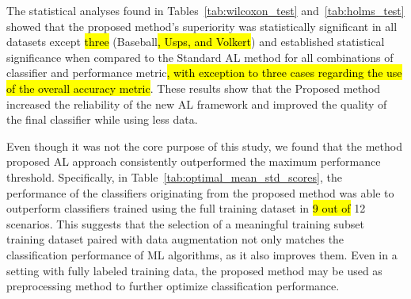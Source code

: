 \documentclass[preprint, 12pt]{elsarticle}
\begin{document}
The statistical analyses found in Tables~\ref{tab:wilcoxon_test}
and~\ref{tab:holms_test} showed that the proposed method's superiority was
statistically significant in all datasets except \hl{three} (Baseball\hl{,
Usps, and Volkert}) and established statistical significance when compared to
the Standard AL method for all combinations of classifier and performance
metric\hl{, with exception to three cases regarding the use of the overall
accuracy metric}. These results show that the Proposed method increased the
reliability of the new AL framework and improved the quality of the final
classifier while using less data.

Even though it was not the core purpose of this study, we found that the
method proposed AL approach consistently outperformed the maximum performance
threshold. Specifically, in Table~\ref{tab:optimal_mean_std_scores}, the
performance of the classifiers originating from the proposed method was able
to outperform classifiers trained using the full training dataset in \hl{9 out
of} 12 scenarios. This suggests that the selection of a meaningful training
subset training dataset paired with data augmentation not only matches the
classification performance of ML algorithms, as it also improves them. Even in
a setting with fully labeled training data, the proposed method may be used as
preprocessing method to further optimize classification performance.
\end{document}

